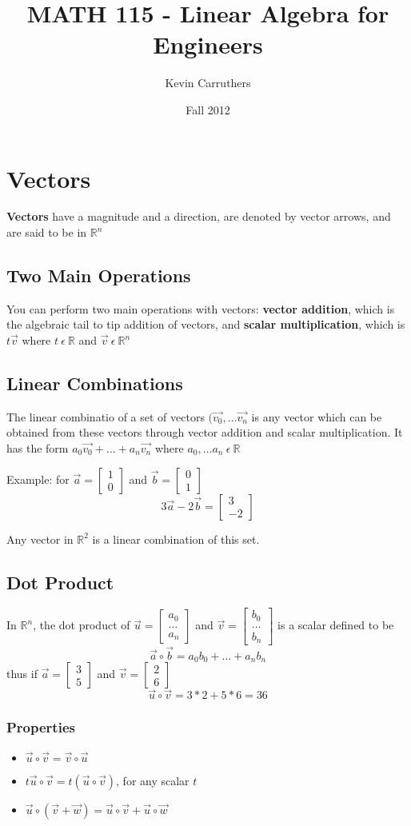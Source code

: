 \documentclass[12pt]{article}
\newcommand{\R}[1]{\mathbb{R}^{#1}}
\newcommand{\vectwo}[2]{\begin{bmatrix}#1\\#2\end{bmatrix}}
\newcommand{\vecthree}[3]{\begin{bmatrix}#1\\#2\\#3\end{bmatrix}}
\begin{document}
\title{MATH 115 - Linear Algebra for Engineers}
\author{Kevin Carruthers}
\date{\vspace{-2ex}Fall 2012}
\maketitle\HRule

\section*{Vectors}
{\bf Vectors} have a magnitude and a direction, are denoted by vector arrows, and are said to be in $\R{n}$

\subsection*{Two Main Operations}
You can perform two main operations with vectors: {\bf vector addition}, which is the algebraic tail to tip addition of vectors, and {\bf scalar multiplication}, which is $t\vec{v}$ where $t\ \epsilon\ \mathbb{R}$ and $\vec{v}\ \epsilon\ \R{n}$

\subsection*{Linear Combinations}
The linear combinatio of a set of vectors $(\vec{v_0},\dots \vec{v_n}$ is any vector which can be obtained from these vectors through vector addition and scalar multiplication. It has the form $a_0\vec{v_0} + \dots + a_n\vec{v_n}$ where $a_0,\dots a_n\ \epsilon\ \mathbb{R}$

Example: for $\vec{a} = \vectwo{1}{0}$ and $\vec{b} = \vectwo{0}{1}$
\[ 3\vec{a} - 2\vec{b} = \vectwo{3}{-2} \]

Any vector in $\R{2}$ is a linear combination of this set.

\subsection*{Dot Product}
In $\R{n}$, the dot product of $\vec{u} = \vecthree{a_0}{\dots}{a_n}$ and $\vec{v} = \vecthree{b_0}{\dots}{b_n}$ is a scalar defined to be \[ \vec{a}\circ\vec{b} = a_0b_0 + \dots + a_nb_n \] thus if $\vec{a} = \vectwo{3}{5}$ and $\vec{v} = \vectwo{2}{6}$ \[ \vec{u}\circ\vec{v} = 3*2 + 5*6 = 36 \]

\subsubsection*{Properties}
\begin{itemize}
\item $\vec{u}\circ\vec{v} = \vec{v}\circ\vec{u}$
\item $t\vec{u}\circ\vec{v} = t(\vec{u}\circ\vec{v})$, for any scalar $t$
\item $\vec{u}\circ(\vec{v} + \vec{w}) = \vec{u}\circ\vec{v} + \vec{u}\circ\vec{w}$
\end{itemize}
\end{document}

